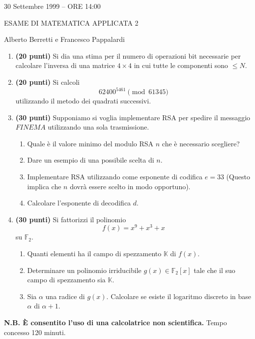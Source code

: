 \documentclass{article}
\begin{document}
\thispagestyle{empty} 
\centerline{30 Settembre 1999 -- ORE 14:00} \centerline{ESAME DI 
MATEMATICA APPLICATA 2} \centerline{Alberto Berretti e Francesco Pappalardi}\bigskip 

\begin{enumerate}

\item {\bf (20 punti)}
Si dia una stima per il numero di operazioni bit necessarie per calcolare
l'inversa di una matrice $4\times4$ in cui tutte le componenti sono $\leq N$.
\bigskip

\item {\bf (20 punti)} 
Si calcoli 
$$62400^{5461} \pmod{61345}$$
utilizzando il metodo dei quadrati successivi.
\bigskip\bigskip

\item {\bf (30 punti)} Supponiamo si voglia implementare 
RSA per spedire il messaggio $FINEMA$ utilizzando una
sola trasmissione.
\begin{enumerate} 
\item Quale \`{e} il valore minimo del modulo RSA $n$ che \`{e}
necessario scegliere?

\item Dare un esempio di una possibile scelta di $n$.

\item Implementare RSA utilizzando come esponente di codifica $e=33$
(Questo implica che $n$ dovr\`{a} essere scelto in modo opportuno).

\item Calcolare l'esponente di decodifica $d$.
\end{enumerate}
 \bigskip\bigskip

\item {\bf (30 punti)} Si fattorizzi il polinomio
$$f(x)=x^9+x^3+x$$
su $\mathbb F_2$.
\begin{enumerate}
\item Quanti elementi ha il campo di spezzamento $\mathbb K$ di $f(x)$.

\item Determinare un polinomio irriducibile $g(x)\in\mathbb F_2[x]$
tale che il suo campo di spezzamento sia $\mathbb K$. 

\item Sia $\alpha$ una radice di $g(x)$. Calcolare se esiste il 
logaritmo discreto in base $\alpha$ di $\alpha+1$.
\end{enumerate} \bigskip\bigskip
\end{enumerate}

{\bf N.B. \`E consentito l'uso di una calcolatrice non scientifica.} Tempo concesso 120 
minuti. 
\end{document}
